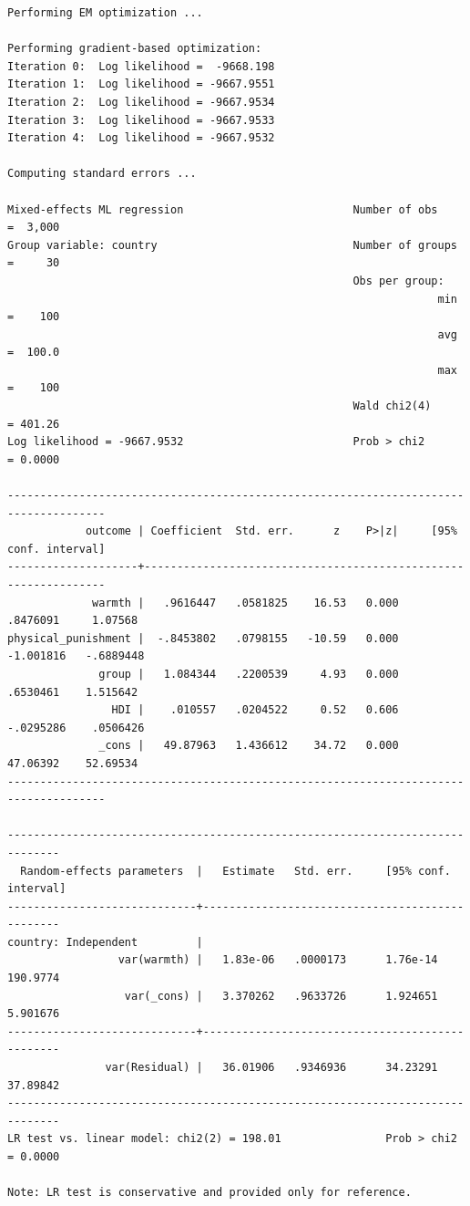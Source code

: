 \documentclass[
  letterpaper,
  DIV=11,
  numbers=noendperiod,
  oneside]{scrreprt}
\begin{document}
\begin{verbatim}
Performing EM optimization ...

Performing gradient-based optimization: 
Iteration 0:  Log likelihood =  -9668.198  
Iteration 1:  Log likelihood = -9667.9551  
Iteration 2:  Log likelihood = -9667.9534  
Iteration 3:  Log likelihood = -9667.9533  
Iteration 4:  Log likelihood = -9667.9532  

Computing standard errors ...

Mixed-effects ML regression                          Number of obs    =  3,000
Group variable: country                              Number of groups =     30
                                                     Obs per group:
                                                                  min =    100
                                                                  avg =  100.0
                                                                  max =    100
                                                     Wald chi2(4)     = 401.26
Log likelihood = -9667.9532                          Prob > chi2      = 0.0000

-------------------------------------------------------------------------------------
            outcome | Coefficient  Std. err.      z    P>|z|     [95% conf. interval]
--------------------+----------------------------------------------------------------
             warmth |   .9616447   .0581825    16.53   0.000     .8476091     1.07568
physical_punishment |  -.8453802   .0798155   -10.59   0.000    -1.001816   -.6889448
              group |   1.084344   .2200539     4.93   0.000     .6530461    1.515642
                HDI |    .010557   .0204522     0.52   0.606    -.0295286    .0506426
              _cons |   49.87963   1.436612    34.72   0.000     47.06392    52.69534
-------------------------------------------------------------------------------------

------------------------------------------------------------------------------
  Random-effects parameters  |   Estimate   Std. err.     [95% conf. interval]
-----------------------------+------------------------------------------------
country: Independent         |
                 var(warmth) |   1.83e-06   .0000173      1.76e-14    190.9774
                  var(_cons) |   3.370262   .9633726      1.924651    5.901676
-----------------------------+------------------------------------------------
               var(Residual) |   36.01906   .9346936      34.23291    37.89842
------------------------------------------------------------------------------
LR test vs. linear model: chi2(2) = 198.01                Prob > chi2 = 0.0000

Note: LR test is conservative and provided only for reference.
\end{verbatim}
\end{document}
